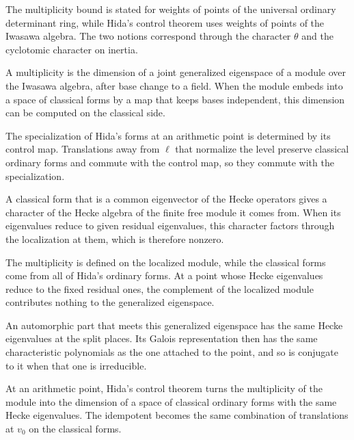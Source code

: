 The multiplicity bound is stated for weights of points of the universal ordinary determinant ring, while Hida's control theorem uses weights of points of the Iwasawa algebra. The two notions correspond through the character $\theta$ and the cyclotomic character on inertia.

A multiplicity is the dimension of a joint generalized eigenspace of a module over the Iwasawa algebra, after base change to a field. When the module embeds into a space of classical forms by a map that keeps bases independent, this dimension can be computed on the classical side.

The specialization of Hida's forms at an arithmetic point is determined by its control map. Translations away from $\ell$ that normalize the level preserve classical ordinary forms and commute with the control map, so they commute with the specialization.

A classical form that is a common eigenvector of the Hecke operators gives a character of the Hecke algebra of the finite free module it comes from. When its eigenvalues reduce to given residual eigenvalues, this character factors through the localization at them, which is therefore nonzero.

The multiplicity is defined on the localized module, while the classical forms come from all of Hida's ordinary forms. At a point whose Hecke eigenvalues reduce to the fixed residual ones, the complement of the localized module contributes nothing to the generalized eigenspace.

An automorphic part that meets this generalized eigenspace has the same Hecke eigenvalues at the split places. Its Galois representation then has the same characteristic polynomials as the one attached to the point, and so is conjugate to it when that one is irreducible.

At an arithmetic point, Hida's control theorem turns the multiplicity of the module into the dimension of a space of classical ordinary forms with the same Hecke eigenvalues. The idempotent becomes the same combination of translations at $v_0$ on the classical forms.

